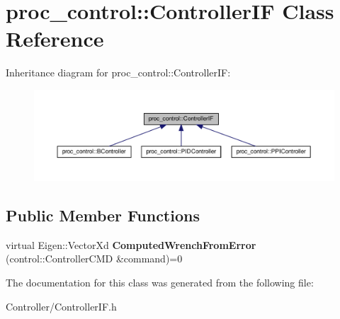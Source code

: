 \hypertarget{classproc__control_1_1_controller_i_f}{}\section{proc\+\_\+control\+:\+:Controller\+IF Class Reference}
\label{classproc__control_1_1_controller_i_f}


Inheritance diagram for proc\+\_\+control\+:\+:Controller\+IF\+:\nopagebreak
\begin{figure}[H]
\begin{center}
\leavevmode
\includegraphics[width=350pt]{classproc__control_1_1_controller_i_f__inherit__graph}
\end{center}
\end{figure}
\subsection*{Public Member Functions}
\begin{DoxyCompactItemize}
\item 
\mbox{\label{classproc__control_1_1_controller_i_f_a4abdd5192893128a0a07dd6cfed4c4cb}} 
virtual Eigen\+::\+Vector\+Xd {\bfseries Computed\+Wrench\+From\+Error} (control\+::\+Controller\+C\+MD \&command)=0
\end{DoxyCompactItemize}


The documentation for this class was generated from the following file\+:\begin{DoxyCompactItemize}
\item 
Controller/Controller\+I\+F.\+h\end{DoxyCompactItemize}
